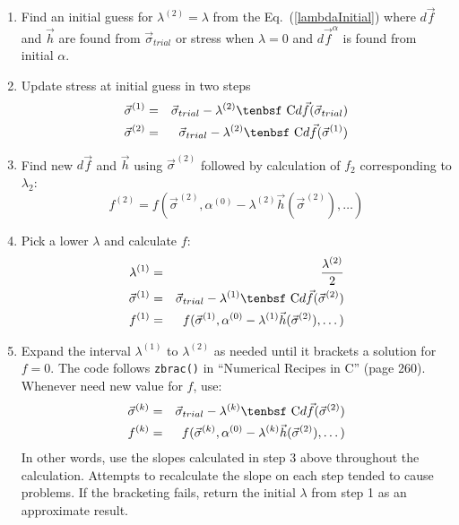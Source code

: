 \documentclass[11pt]{article}
\def\C{\hbox{\tenbsf C}}
\def\df{d \vec{f}}
\def\dfa{d \vec{f}^\alpha}
\def\s#1{\sigma_{#1}}
\begin{document}
\begin{enumerate}

\item Find an initial guess for $\lambda^{(2)}=\lambda$ from the Eq.~(\ref{lambdaInitial}) where $\df$ and $\vec h$ are found from ${\vec\s{trial}}$ or stress when $\lambda=0$ and $\dfa$ is found from initial $\alpha$.

\item Update stress at initial guess in two steps
\begin{eqnarray}
      {\vec\s{}}^{(1)} & = & {\vec\s{trial}} - \lambda^{(2)}\C\df({\vec\s{trial}}) \\
      {\vec\s{}}^{(2)} & = & {\vec\s{trial}} - \lambda^{(2)}\C\df({\vec\s{}}^{(1)}) 
\end{eqnarray}

\item Find new $\df$ and $\vec h$ using ${\vec\s{}}^{(2)}$ followed by calculation of $f_2$ corresponding to $\lambda_2$:
\begin{equation}
     f^{(2)} =  f({\vec\s{}}^{(2)},\alpha^{(0)} - \lambda^{(2)} \vec h({\vec\s{}}^{(2)}),\dots)
\end{equation}

\item Pick a lower $\lambda$ and calculate $f$:
\begin{eqnarray}
     \lambda^{(1)} & = & {\lambda^{(2)}\over 2} \\
      {\vec\s{}}^{(1)} & = & {\vec\s{trial}} - \lambda^{(1)}\C\df({\vec\s{}}^{(2)}) \\
     f^{(1)} & = &  f({\vec\s{}}^{(1)},\alpha^{(0)} - \lambda^{(1)} \vec h({\vec\s{}}^{(2)}),\dots)
\end{eqnarray}

\item Expand the interval $\lambda^{(1)}$ to $\lambda^{(2)}$ as needed until it brackets a solution for $f=0$. The code follows {\tt zbrac()} in ``Numerical Recipes in C'' (page 260). Whenever need new value for $f$, use:
\begin{eqnarray}
      {\vec\s{}}^{(k)} & = & {\vec\s{trial}} - \lambda^{(k)}\C\df({\vec\s{}}^{(2)}) \\
     f^{(k)} & = &  f({\vec\s{}}^{(k)},\alpha^{(0)} - \lambda^{(k)} \vec h({\vec\s{}}^{(2)}),\dots)
\end{eqnarray}
In other words, use the slopes calculated in step 3 above throughout the calculation. Attempts to recalculate the slope on each step tended to cause problems. If the bracketing fails, return the initial $\lambda$ from step 1 as an approximate result.


\end{enumerate}
\end{document}
